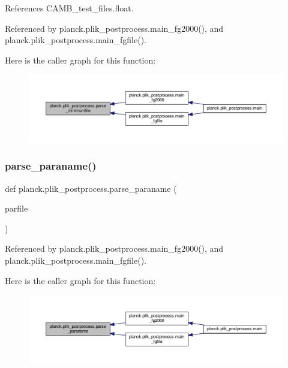 References C\+A\+M\+B\+\_\+test\+\_\+files.\+float.



Referenced by planck.\+plik\+\_\+postprocess.\+main\+\_\+fg2000(), and planck.\+plik\+\_\+postprocess.\+main\+\_\+fgfile().

Here is the caller graph for this function\+:
\nopagebreak
\begin{figure}[H]
\begin{center}
\leavevmode
\includegraphics[width=350pt]{namespaceplanck_1_1plik__postprocess_aa2e7d0756c0811893711c9aecf83baee_icgraph}
\end{center}
\end{figure}
\mbox{\label{namespaceplanck_1_1plik__postprocess_a7c4d0811ef982dbc43966c8a53f9f32a}} 
\subsubsection{\texorpdfstring{parse\+\_\+paraname()}{parse\_paraname()}}
{\footnotesize\ttfamily def planck.\+plik\+\_\+postprocess.\+parse\+\_\+paraname (\begin{DoxyParamCaption}\item[{}]{parfile }\end{DoxyParamCaption})}



Referenced by planck.\+plik\+\_\+postprocess.\+main\+\_\+fg2000(), and planck.\+plik\+\_\+postprocess.\+main\+\_\+fgfile().

Here is the caller graph for this function\+:
\nopagebreak
\begin{figure}[H]
\begin{center}
\leavevmode
\includegraphics[width=350pt]{namespaceplanck_1_1plik__postprocess_a7c4d0811ef982dbc43966c8a53f9f32a_icgraph}
\end{center}
\end{figure}


